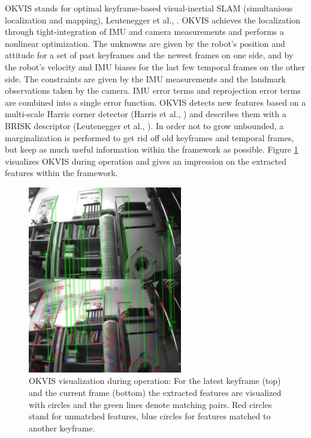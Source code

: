 OKVIS stands for optimal keyframe-based visual-inertial SLAM (simultanious localization and mapping), Leutenegger et al., \cite{leutenegger2015keyframe}. OKVIS achieves the localization through tight-integration of IMU and camera measurements and performs a nonlinear optimization. The unknowns are given by the robot's position and attitude for a set of past keyframes and the newest frames on one side, and by the robot's velocity and IMU biases for the last few temporal frames on the other side. The constraints are given by the IMU measurements and the landmark observations taken by the camera. IMU error terms and reprojection error terms are combined into a single error function. OKVIS detects new features based on a multi-scale Harris corner detector (Harris et al., \cite{harris1988combined}) and describes them with a BRISK descriptor (Leutenegger et al., \cite{leutenegger2011brisk}). In order not to grow unbounded, a marginalization is performed to get rid off old keyframes and temporal frames, but keep as much useful information within the framework as possible. Figure \ref{pics:okvis_frontend} visualizes OKVIS during operation and gives an impression on the extracted features within the framework.

\begin{figure}[h]
   \centering
   \includegraphics[width=0.6\textwidth]{images/okvis_frontend.png}
   \caption{OKVIS visualization during operation: For the latest keyframe (top) and the current frame (bottom) the extracted features are visualized with circles and the green lines denote matching pairs. Red circles stand for unmatched features, blue circles for features matched to another keyframe.}
   \label{pics:okvis_frontend}
\end{figure}


